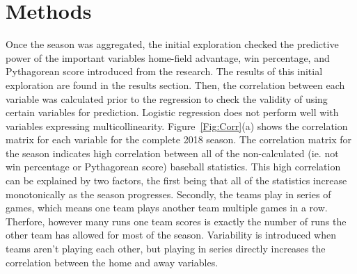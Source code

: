 \documentclass{article}
\begin{document}
\section{Methods}
Once the season was aggregated,
the initial exploration checked the predictive power of the important variables
home-field advantage,
win percentage,
and Pythagorean score introduced from the research.
The results of this initial exploration are found in the results section.
Then,
the correlation between each variable was calculated prior to the regression
to check the validity of using certain variables for prediction.
Logistic regression does not perform well with variables expressing 
multicollinearity.
Figure~\ref{Fig:Corr}(a) shows the correlation matrix for each variable for the
complete 2018 season.
The correlation matrix for the season indicates high correlation between all
of the non-calculated 
(ie. not win percentage or Pythagorean score) baseball statistics.
This high correlation can be explained by two factors,
the first being that all of the statistics increase monotonically as the 
season progresses.
Secondly,
the teams play in series of games,
which means one team plays another team multiple games in a row.
Therfore,
however many runs one team scores is exactly the number of runs the other team
has allowed for most of the season.
Variability is introduced when teams aren't playing each other,
but playing in series directly increases the correlation between the 
home and away variables.\par
\end{document}
